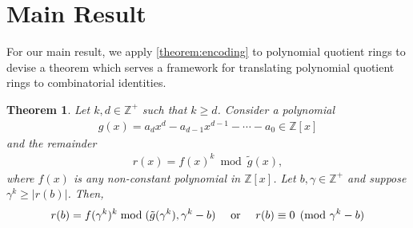 \documentclass[12pt,reqno]{article}
\theoremstyle{plain}
\newtheorem{theorem}{Theorem}
\theoremstyle{definition}
\begin{document}
\section{Main Result} \label{section:results}
For our main result, we apply \cref{theorem:encoding} to polynomial quotient rings to devise a theorem which serves a framework for translating polynomial quotient rings to combinatorial identities.

\begin{theorem} \label{theorem:kroneckerqrings}
Let $k, d \in \mathbb{Z}^+$ such that $k \geq d$. Consider a polynomial
\begin{align*}
g(x) = a_d x^d - a_{d-1} x^{d-1} - \cdots - a_0 \in \mathbb{Z}[x]
\end{align*}
and the remainder
\begin{align*}
r(x) = f(x)^k  \bmod{\tilde{g}(x)} ,
\end{align*}
where $f(x)$ is any non-constant polynomial in $\mathbb{Z}[x]$. Let $b, \gamma \in \mathbb{Z}^+$ and suppose $\gamma^k \geq |r(b)|$. Then,
\begin{align*}
r(b) = f(\gamma^k)^k \bmod{(\tilde{g}(\gamma^k), \gamma^k - b)}
\quad \textup{ or }
\quad r(b) \equiv 0 \pmod{\gamma^k - b}
\end{align*}

\end{theorem}
\end{document}

